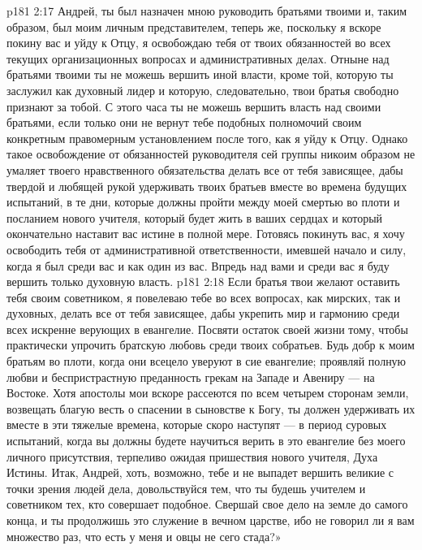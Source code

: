 \vs p181 2:17 Андрей, ты был назначен мною руководить братьями твоими и, таким образом, был моим личным представителем, теперь же, поскольку я вскоре покину вас и уйду к Отцу, я освобождаю тебя от твоих обязанностей во всех текущих организационных вопросах и административных делах. Отныне над братьями твоими ты не можешь вершить иной власти, кроме той, которую ты заслужил как духовный лидер и которую, следовательно, твои братья свободно признают за тобой. С этого часа ты не можешь вершить власть над своими братьями, если только они не вернут тебе подобных полномочий своим конкретным правомерным установлением после того, как я уйду к Отцу. Однако такое освобождение от обязанностей руководителя сей группы никоим образом не умаляет твоего нравственного обязательства делать все от тебя зависящее, дабы твердой и любящей рукой удерживать твоих братьев вместе во времена будущих испытаний, в те дни, которые должны пройти между моей смертью во плоти и посланием нового учителя, который будет жить в ваших сердцах и который окончательно наставит вас истине в полной мере. Готовясь покинуть вас, я хочу освободить тебя от административной ответственности, имевшей начало и силу, когда я был среди вас и как один из вас. Впредь над вами и среди вас я буду вершить только духовную власть.
\vs p181 2:18 Если братья твои желают оставить тебя своим советником, я повелеваю тебе во всех вопросах, как мирских, так и духовных, делать все от тебя зависящее, дабы укрепить мир и гармонию среди всех искренне верующих в евангелие. Посвяти остаток своей жизни тому, чтобы практически упрочить братскую любовь среди твоих собратьев. Будь добр к моим братьям во плоти, когда они всецело уверуют в сие евангелие; проявляй полную любви и беспристрастную преданность грекам на Западе и Авениру --- на Востоке. Хотя апостолы мои вскоре рассеются по всем четырем сторонам земли, возвещать благую весть о спасении в сыновстве к Богу, ты должен удерживать их вместе в эти тяжелые времена, которые скоро наступят --- в период суровых испытаний, когда вы должны будете научиться верить в это евангелие без моего личного присутствия, терпеливо ожидая пришествия нового учителя, Духа Истины. Итак, Андрей, хоть, возможно, тебе и не выпадет вершить великие с точки зрения людей дела, довольствуйся тем, что ты будешь учителем и советником тех, кто совершает подобное. Свершай свое дело на земле до самого конца, и ты продолжишь это служение в вечном царстве, ибо не говорил ли я вам множество раз, что есть у меня и овцы не сего стада?»
